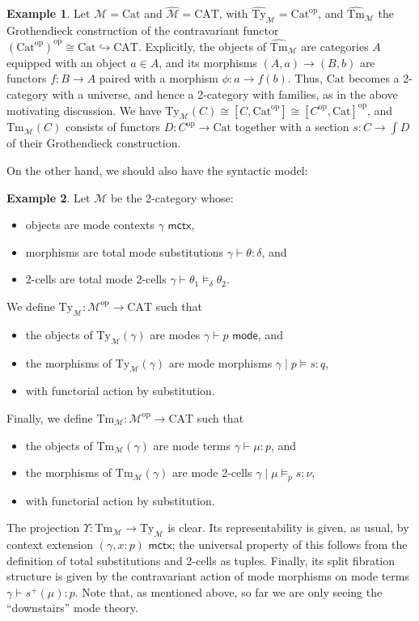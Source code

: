 \documentclass[10pt]{article}
\theoremstyle{definition}
\newtheorem{example}{Example}
\newcommand{\yields}{\vdash}
\newcommand{\ctx}{\,\,\mathsf{mctx}}
\newcommand{\type}{\,\,\mathsf{mode}}
\newcommand\TypeTwo[4]{\ensuremath{#1 \mid #3 \vDash #2 : #4}}
\newcommand\TermTwoT[5]{\ensuremath{#1 \mid #3 \vDash_{#5} #2 : #4}}
\newcommand\TrPlus[2]{\ensuremath{{#1}^+(#2)}}
\newcommand\op{^{\mathrm{op}}}
\newcommand\Cat{\mathrm{Cat}}
\newcommand\CAT{\mathrm{CAT}}
\newcommand\M{\mathcal{M}}
\newcommand\Mhat{\widehat{\mathcal{M}}}
\newcommand\Mty{{\mathrm{Ty}_{\M}}}
\newcommand\Mtm{{\mathrm{Tm}_{\M}}}
\newcommand\Mtyhat{{\widehat{\mathrm{Ty}}_{\M}}}
\newcommand\Mtmhat{{\widehat{\mathrm{Tm}}_{\M}}}
\newcommand\Ups{\Upsilon}
\begin{document}
\begin{example}\label{eg:cat-2cwf}
  Let $\M=\Cat$ and $\Mhat=\CAT$, with $\Mtyhat = \Cat\op$, and $\Mtmhat$ the Grothendieck construction of the contravariant functor $(\Cat\op)\op \cong \Cat \hookrightarrow \CAT$.
  Explicitly, the objects of $\Mtmhat$ are categories $A$ equipped with an object $a\in A$, and its morphisms $(A,a) \to (B,b)$ are functors $f:B\to A$ paired with a morphism $\phi : a\to f(b)$.
  Thus, $\Cat$ becomes a 2-category with a universe, and hence a 2-category with families, as in the above motivating discussion.
  We have $\Mty(C) \cong [C,\Cat\op] \cong [C\op,\Cat]\op$, and $\Mtm(C)$ consists of functors $D:C\op\to\Cat$ together with a section $s:C\to \int D$ of their Grothendieck construction.
\end{example}

On the other hand, we should also have the syntactic model:

\begin{example}\label{eg:syn-2cwf}
  Let $\M$ be the 2-category whose:
  \begin{itemize}
  \item objects are mode contexts $\gamma \ctx$,
  \item morphisms are total mode substitutions $\gamma \yields \theta : \delta$, and
  \item 2-cells are total mode 2-cells $\gamma \yields \theta_1 \vDash_\delta \theta_2$.
  \end{itemize}
  We define $\Mty:\M\op\to\CAT$ such that
  \begin{itemize}
  \item the objects of $\Mty(\gamma)$ are modes $\gamma \yields p\type$, and
  \item the morphisms of $\Mty(\gamma)$ are mode morphisms $\TypeTwo{\gamma}{s}{p}{q}$,
  \item with functorial action by substitution.
  \end{itemize}
  Finally, we define $\Mtm:\M\op\to\CAT$ such that
  \begin{itemize}
  \item the objects of $\Mtm(\gamma)$ are mode terms $\gamma \yields \mu:p$, and
  \item the morphisms of $\Mtm(\gamma)$ are mode 2-cells $\TermTwoT{\gamma}{s}{\mu}{\nu}{p}$,
  \item with functorial action by substitution.
  \end{itemize}
  The projection $\Ups:\Mtm\to\Mty$ is clear.
  Its representability is given, as usual, by context extension $(\gamma, x:p) \ctx$; the universal property of this follows from the definition of total substitutions and 2-cells as tuples.
  Finally, its split fibration structure is given by the contravariant action of mode morphisms on mode terms ${\gamma \yields \TrPlus{s}{\mu} : p}$.
  Note that, as mentioned above, so far we are only seeing the ``downstairs'' mode theory.
\end{example}
\end{document}
